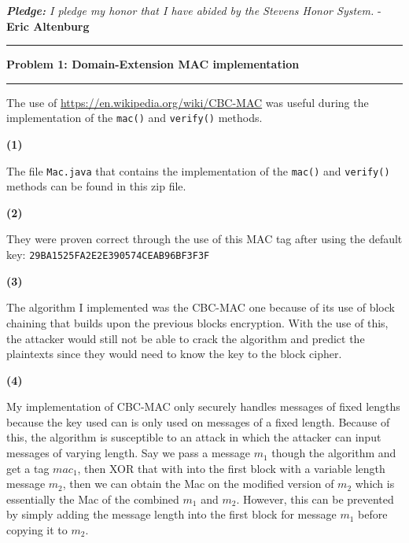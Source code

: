 \documentclass[11pt]{article}
\newcommand\question[2]{\vspace{.25in}\hrule\textbf{#1: #2}\vspace{.5em}\hrule\vspace{.10in}}
\renewcommand\part[1]{\vspace{.10in}\textbf{(#1)}\par}
\begin{document}
\raggedright
\newcommand\NAME{Eric Altenburg}  %
\newcommand\COURSE{CS-306}
\newcommand\HWNUM{2}              %
\newcommand{\bigO}{\mathcal{O}}


\begin{center}
	\textit{\textbf{Pledge:} I pledge my honor that I have abided by the Stevens Honor System.} - \textbf{\NAME}
\end{center}


\question{Problem 1}{Domain-Extension MAC implementation}
	The use of \url{https://en.wikipedia.org/wiki/CBC-MAC} was useful during the implementation of the \texttt{mac()} and \texttt{verify()} methods.

	\part{1}
		The file \texttt{Mac.java} that contains the implementation of the \texttt{mac()} and \texttt{verify()} methods can be found in this zip file. 

	\part{2}
		They were proven correct through the use of this MAC tag after using the default key: \texttt{29BA1525FA2E2E390574CEAB96BF3F3F}

	\part{3}
		The algorithm I implemented was the CBC-MAC one because of its use of block chaining that builds upon the previous blocks encryption. With the use of this, the attacker would still not be able to crack the algorithm and predict the plaintexts since they would need to know the key to the block cipher.
	
	\part{4}
		My implementation of CBC-MAC only securely handles messages of fixed lengths because the key used can is only used on messages of a fixed length. Because of this, the algorithm is susceptible to an attack in which the attacker can input messages of varying length. Say we pass a message $m_1$ though the algorithm and get a tag $mac_1$, then XOR that with into the first block with a variable length message $m_2$, then we can obtain the Mac on the modified version of $m_2$ which is essentially the Mac of the combined $m_1$ and $m_2$. However, this can be prevented by simply adding the message length into the first block for message $m_1$ before copying it to $m_2$.
\end{document}
